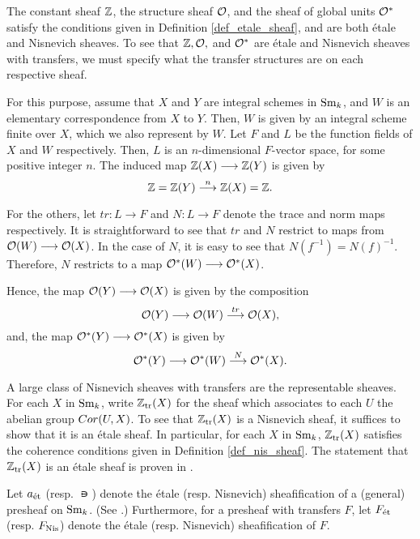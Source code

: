 \begin{ex}\label{ex_Z_O_Ostar}
The constant sheaf $\mathbb{Z}$, the structure sheaf $\mathcal{O}$, and the sheaf
of global units $\mathcal{O}^*$ satisfy the conditions given in Definition
\ref{def_etale_sheaf}, and are both \'etale and Nisnevich sheaves.
To see that $\mathbb{Z}, \mathcal{O},$ and $\mathcal{O}^*$ are \'etale and Nisnevich sheaves
with transfers, we must specify what the transfer structures are
on each respective sheaf.

For this purpose, assume that $X$ and $Y$ are integral schemes
in $\mathrm{Sm}_{k}$, and $W$ is an elementary correspondence from $X$ to $Y$. 
Then, $W$ is given by an integral scheme finite over $X$, which we 
also represent by $W$. Let $F$ and $L$ be the function fields of 
$X$ and $W$ respectively. Then, $L$ is an $n$-dimensional
$F$-vector space, for some positive integer $n$. The induced 
map $\mathbb{Z}(X) \longrightarrow \mathbb{Z}(Y)$ is given by
\[
\mathbb{Z} = \mathbb{Z}(Y) \stackrel{n}{\longrightarrow} \mathbb{Z}(X) = \mathbb{Z}.
\]

For the others, let $tr: L \to F$ and $N: L \to F$ denote the 
trace and norm maps respectively. It is straightforward to see 
that $tr$ and $N$ restrict to maps from $\mathcal{O}(W) \longrightarrow \mathcal{O}(X)$. In
the case of $N$, it is easy to see that $N(f^{-1}) = N(f)^{-1}$.
Therefore, $N$ restricts to a map $\mathcal{O}^*(W) \longrightarrow \mathcal{O}^*(X)$.

Hence, the map $\mathcal{O}(Y) \longrightarrow \mathcal{O}(X)$ is given by the composition
\[
\mathcal{O}(Y) \longrightarrow \mathcal{O}(W) \stackrel{tr}{\longrightarrow} \mathcal{O}(X),
\]
and, the map $\mathcal{O}^*(Y) \longrightarrow \mathcal{O}^*(X)$ is given by
\[
\mathcal{O}^*(Y) \longrightarrow \mathcal{O}^*(W) \stackrel{N}{\longrightarrow} \mathcal{O}^*(X).
\]
\end{ex}

\begin{ex}\label{ex_ZtrX}
A large class of Nisnevich sheaves with transfers are the 
representable sheaves. For each $X$ in $\mathrm{Sm}_{k}$, write $\mathbb{Z}_{\mathrm{tr}}(X)$
for the sheaf which associates to each $U$ the abelian group
$Cor(U, X)$. To see that $\mathbb{Z}_{\mathrm{tr}}(X)$ is a Nisnevich sheaf, it
suffices to show that it is an \'etale sheaf. In particular,
for each $X$ in $\mathrm{Sm}_{k}$, $\mathbb{Z}_{\mathrm{tr}}(X)$ satisfies the coherence 
conditions given in Definition \ref{def_nis_sheaf}. The statement that
$\mathbb{Z}_{\mathrm{tr}}(X)$ is an \'etale sheaf is proven in \cite[6.2]{MVW}.
\end{ex}

Let $a_{\mathrm{\acute{e}t}}$ (resp. $\nis$) denote the \'etale (resp. Nisnevich)
sheafification of a (general) presheaf on $\mathrm{Sm}_{k}$. (See
\cite[3.1.1]{Tamme}.) Furthermore, for a presheaf with transfers $F$,
let $F_{\mathrm{\acute{e}t}}$ (resp. $F_{\mathrm{Nis}}$) denote the \'etale (resp.
Nisnevich) sheafification of $F$.

